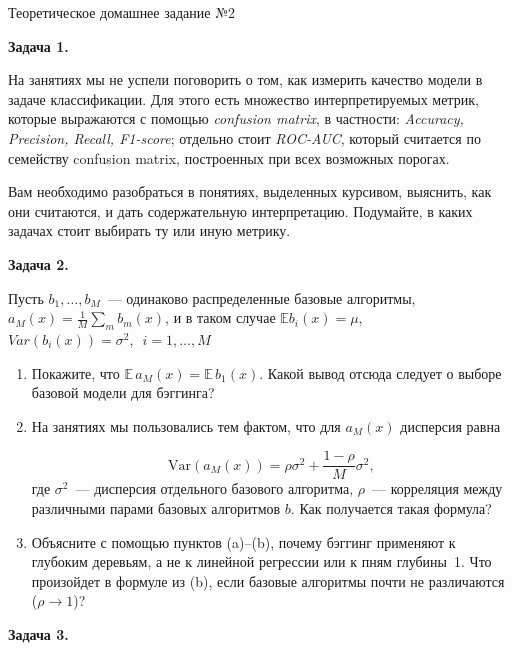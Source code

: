 \documentclass[12pt,a4paper]{article}
\begin{document}
\begin{center}
    {\Large Теоретическое домашнее задание №2}\\[8pt]
\end{center}

\vspace{2em}

\noindent
\textbf{Задача 1.} 

На занятиях мы не успели поговорить о том, как измерить качество модели в задаче классификации. Для этого есть множество интерпретируемых метрик, которые выражаются с помощью \textit{confusion matrix}, в частности: \textit{Accuracy, Precision, Recall, F1-score}; отдельно стоит \textit{ROC-AUC}, который считается по семейству confusion matrix, построенных при всех возможных порогах.


Вам необходимо разобраться в понятиях, выделенных курсивом, выяснить, как они считаются, и дать содержательную интерпретацию. Подумайте, в каких задачах стоит выбирать ту или иную метрику.

\vspace{2em}
\noindent
\textbf{Задача 2.}

Пусть $b_1,\dots,b_M$~--- одинаково распределенные базовые алгоритмы, $a_M(x)=\frac{1}{M}\sum_m b_m(x)$, и в таком случае $\mathbb{E}b_i(x)=\mu$, $Var(b_i(x))=\sigma^2, \,\,\, i=1,\dots,M$
\begin{enumerate}[label=(\alph*)]
	\item Покажите, что $\mathbb{E}\,a_M(x)=\mathbb{E}\,b_1(x)$. Какой вывод отсюда следует о выборе базовой модели для бэггинга?
	\item На занятиях мы пользовались тем фактом, что для $a_M(x)$ дисперсия равна
	
	\[
	\mathrm{Var}(a_M(x))=\rho\sigma^2+\frac{1-\rho}{M}\sigma^2,
	\]
	где $\sigma^2$~--- дисперсия отдельного базового алгоритма, $\rho$~--- корреляция между различными парами базовых алгоритмов $b$. Как получается такая формула? 
	\item Объясните с помощью пунктов (a)--(b), почему бэггинг применяют к глубоким деревьям, а не к линейной регрессии или к пням глубины~1. Что произойдет в формуле из (b), если базовые алгоритмы почти не различаются ($\rho\to1$)?

\end{enumerate}
\vspace{2em}
\noindent
\textbf{Задача 3.} 
\end{document}
